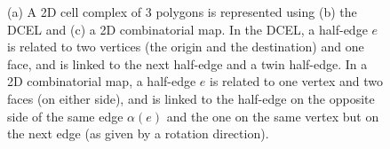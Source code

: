 \begin{figure}[tbp]
\centering
{}
\quad
{}
\quad
{}
\caption[A 2D cell complex as a DCEL and a 2D combinatorial map]{(a) A 2D cell complex of 3 polygons is represented using (b) the DCEL and (c) a 2D combinatorial map. In the DCEL, a half-edge $e$ is related to two vertices (the origin and the destination) and one face, and is linked to the next half-edge and a twin half-edge. In a 2D combinatorial map, a half-edge $e$ is related to one vertex and two faces (on either side), and is linked to the half-edge on the opposite side of the same edge $\alpha(e)$ and the one on the same vertex but on the next edge (as given by a rotation direction).}
\label{fig:halfedge}
\end{figure}

